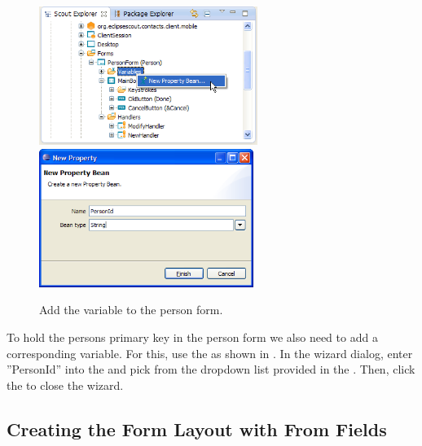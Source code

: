 \documentclass[a4paper,10pt,twoside]{book}
\begin{document}
\begin{figure}
\includegraphics[height=4.5cm]{new_bean_personid_contextmenu.png} \hspace{5mm}
\includegraphics[height=4.5cm]{new_bean_personid.png}
\caption{Add the  variable to the person form.}
\end{figure}

To hold the persons primary key in the person form we also need to add a corresponding variable. 
For this, use the  as shown in . 
In the wizard dialog, enter ''PersonId'' into the  and pick  from the dropdown list provided in the . 
Then, click the  to close the wizard. 

\subsection{Creating the Form Layout with From Fields}
\end{document}
